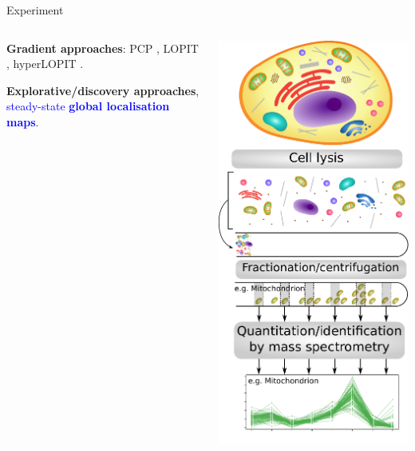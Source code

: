 \begin{frame}[t]{Experiment}
  \begin{columns}
    \begin{column}{0.5\textwidth}
      
      \textbf{Gradient approaches}: PCP \citep{Dunkley:2006}, LOPIT
      \citep{Foster2006}, hyperLOPIT
      \citep{Christoforou:2016,Mulvey:2017}.

      \bigskip
      
      \textbf{Explorative/discovery approaches},
      \textcolor{Blue}{steady-state \textbf{global localisation
          maps}}.
      
    \end{column}
    \begin{column}{0.5\textwidth}
      \includegraphics[width=.7\linewidth]{figs/workflow_primary.pdf}
    \end{column}    
  \end{columns}
\end{frame}


